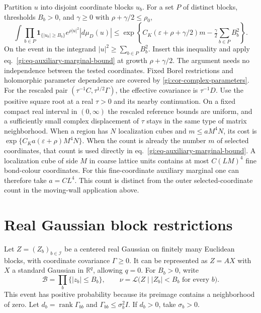 \documentclass[11pt,letterpaper,reqno]{amsart}
\numberwithin{equation}{section}
\renewcommand{\eqref}[1]{\textup{eq.~\ref{#1}}}
\theoremstyle{definition}
\theoremstyle{remark}
\begin{document}
Partition \(u\) into disjoint coordinate blocks \(u_b\).
For a set \(P\) of distinct blocks, thresholds \(B_b>0\), and
\(\gamma\ge0\) with \(\rho+\gamma/2\le\rho_0\),
\begin{equation}\label{gi:eq-auxiliary-failure}
 \int \prod_{b\in P}\mathbf1_{\{|u_b|\ge B_b\}}
              e^{\rho|u|^2}|d\mu_D(u)|
 \le
 \exp\!\left\{C_K(\varepsilon+\rho+\gamma/2)m
                   -\tfrac{\gamma}{2}\sum_{b\in P}B_b^2\right\}.
\end{equation}
On the event in the integrand \(|u|^2\ge\sum_{b\in P}B_b^2\).
Insert this inequality and apply
\eqref{gi:eq-auxiliary-marginal-bound} at growth
\(\rho+\gamma/2\). The argument needs no independence between
the tested coordinates. Fixed Borel restrictions and holomorphic
parameter dependence are covered by \cref{gi:cor-complex-parameters}.
For the rescaled pair
\((\tau^{-1}C,\tau^{1/2}\Gamma)\), the effective covariance is
\(\tau^{-1}D\). Use the positive square root at a real
\(\tau>0\) and its nearby continuation. On a fixed compact real
interval in \((0,\infty)\) the rescaled reference bounds are uniform,
and a sufficiently small complex displacement of \(\tau\) stays
in the same type of matrix neighborhood. When a region has
\(N\) localization cubes and \(m\le aM^4N\), its cost is
\(\exp\{C_Ka(\varepsilon+\rho)M^4N\}\). When the count is already
the number \(m\) of selected coordinates, that count is used
directly in \eqref{gi:eq-auxiliary-marginal-bound}.
A localization cube of side $M$ in coarse lattice units
contains at most $C(LM)^4$ fine bond-colour coordinates.
For this fine-coordinate auxiliary marginal one can
therefore take $a=CL^4$. This count is distinct from the
outer selected-coordinate count in the moving-wall
application above.

\section{Real Gaussian block restrictions}
\label{gi:sec-gaussian-cutoffs}

Let \(Z=(Z_b)_{b\in\mathcal I}\) be a centered real Gaussian
on finitely many Euclidean blocks, with coordinate covariance
\(\Gamma\ge0\). It can be represented as \(Z=A X\) with \(X\)
a standard Gaussian in \(\mathbb R^q\), allowing \(q=0\).
For \(B_b>0\), write
\[
 \mathcal B=\prod_b\{|z_b|\le B_b\},\qquad
 \nu=\mathcal L\bigl(Z\mid |Z_b|<B_b\text{ for every }b\bigr).
\]
This event has positive probability because its preimage contains
a neighborhood of zero. Let \(d_b=\operatorname{rank}\Gamma_{bb}\)
and \(\Gamma_{bb}\le\sigma_b^2 I\). If \(d_b>0\), take
\(\sigma_b>0\).
\end{document}
